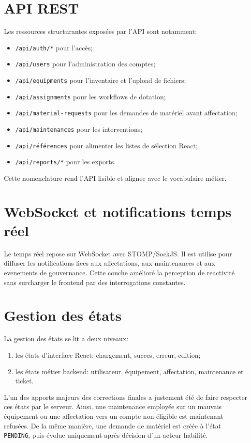 \section{API REST}
Les ressources structurantes exposées par l'API sont notamment:
\begin{itemize}
  \item \texttt{/api/auth/*} pour l'accès;
  \item \texttt{/api/users} pour l'administration des comptes;
  \item \texttt{/api/equipments} pour l'inventaire et l'upload de fichiers;
  \item \texttt{/api/assignments} pour les workflows de dotation;
  \item \texttt{/api/material-requests} pour les demandes de matériel avant affectation;
  \item \texttt{/api/maintenances} pour les interventions;
  \item \texttt{/api/références} pour alimenter les listes de sélection React;
  \item \texttt{/api/reports/*} pour les exports.
\end{itemize}

Cette nomenclature rend l'API lisible et alignee avec le vocabulaire métier.

\section{WebSocket et notifications temps réel}
Le temps réel repose sur WebSocket avec STOMP/SockJS. Il est utilise pour diffuser les notifications liees aux affectations, aux maintenances et aux evenements de gouvernance. Cette couche amélioré la perception de reactivité sans surcharger le frontend par des interrogations constantes.

\section{Gestion des états}
La gestion des états se lit a deux niveaux:
\begin{enumerate}
  \item les états d'interface React: chargement, succes, erreur, edition;
  \item les états métier backend: utilisateur, équipement, affectation, maintenance et ticket.
\end{enumerate}

L'un des apports majeurs des corrections finales a justement été de faire respecter ces états par le serveur. Ainsi, une maintenance employée sur un mauvais équipement ou une affectation vers un compte non éligible est maintenant refusées. De la même manière, une demande de matériel est créée à l'état \texttt{PENDING}, puis évolue uniquement après décision d'un acteur habilité.

